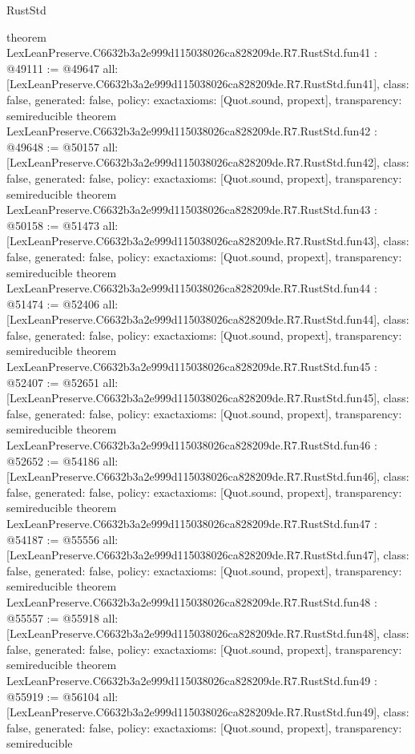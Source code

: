 \begin{lexlean}{RustStd}
\begin{coremodule}
{}
theorem LexLeanPreserve.C6632b3a2e999d115038026ca828209de.R7.RustStd.fun41 : @49111 := @49647 {
  all: [LexLeanPreserve.C6632b3a2e999d115038026ca828209de.R7.RustStd.fun41],
  class: false,
  generated: false,
  policy: exact{axioms: [Quot.sound, propext]},
  transparency: semireducible
}
theorem LexLeanPreserve.C6632b3a2e999d115038026ca828209de.R7.RustStd.fun42 : @49648 := @50157 {
  all: [LexLeanPreserve.C6632b3a2e999d115038026ca828209de.R7.RustStd.fun42],
  class: false,
  generated: false,
  policy: exact{axioms: [Quot.sound, propext]},
  transparency: semireducible
}
theorem LexLeanPreserve.C6632b3a2e999d115038026ca828209de.R7.RustStd.fun43 : @50158 := @51473 {
  all: [LexLeanPreserve.C6632b3a2e999d115038026ca828209de.R7.RustStd.fun43],
  class: false,
  generated: false,
  policy: exact{axioms: [Quot.sound, propext]},
  transparency: semireducible
}
theorem LexLeanPreserve.C6632b3a2e999d115038026ca828209de.R7.RustStd.fun44 : @51474 := @52406 {
  all: [LexLeanPreserve.C6632b3a2e999d115038026ca828209de.R7.RustStd.fun44],
  class: false,
  generated: false,
  policy: exact{axioms: [Quot.sound, propext]},
  transparency: semireducible
}
theorem LexLeanPreserve.C6632b3a2e999d115038026ca828209de.R7.RustStd.fun45 : @52407 := @52651 {
  all: [LexLeanPreserve.C6632b3a2e999d115038026ca828209de.R7.RustStd.fun45],
  class: false,
  generated: false,
  policy: exact{axioms: [Quot.sound, propext]},
  transparency: semireducible
}
theorem LexLeanPreserve.C6632b3a2e999d115038026ca828209de.R7.RustStd.fun46 : @52652 := @54186 {
  all: [LexLeanPreserve.C6632b3a2e999d115038026ca828209de.R7.RustStd.fun46],
  class: false,
  generated: false,
  policy: exact{axioms: [Quot.sound, propext]},
  transparency: semireducible
}
theorem LexLeanPreserve.C6632b3a2e999d115038026ca828209de.R7.RustStd.fun47 : @54187 := @55556 {
  all: [LexLeanPreserve.C6632b3a2e999d115038026ca828209de.R7.RustStd.fun47],
  class: false,
  generated: false,
  policy: exact{axioms: [Quot.sound, propext]},
  transparency: semireducible
}
theorem LexLeanPreserve.C6632b3a2e999d115038026ca828209de.R7.RustStd.fun48 : @55557 := @55918 {
  all: [LexLeanPreserve.C6632b3a2e999d115038026ca828209de.R7.RustStd.fun48],
  class: false,
  generated: false,
  policy: exact{axioms: [Quot.sound, propext]},
  transparency: semireducible
}
theorem LexLeanPreserve.C6632b3a2e999d115038026ca828209de.R7.RustStd.fun49 : @55919 := @56104 {
  all: [LexLeanPreserve.C6632b3a2e999d115038026ca828209de.R7.RustStd.fun49],
  class: false,
  generated: false,
  policy: exact{axioms: [Quot.sound, propext]},
  transparency: semireducible
}
\end{coremodule}
\end{lexlean}
